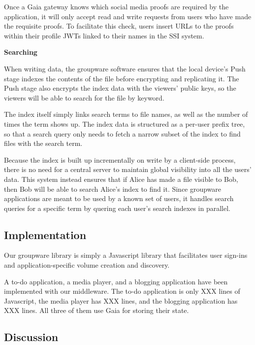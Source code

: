 Once a Gaia gateway knows which social media proofs are required by the
application, it will only accept read and write requests from users who have
made the requisite proofs.  To facilitate this check, users insert URLs to the
proofs within their profile JWTs linked to their names in the SSI system.

\textbf{Searching}

When writing data, the groupware software ensures that the local device's Push
stage indexes the contents of the file before encrypting and replicating it.
The Push stage also encrypts the index data with the viewers' public keys, so
the viewers will be able to search for the file by keyword.

The index itself simply links search terms to file names, as well as the number
of times the term shows up.  The index data is structured as a per-user prefix tree, so
that a search query only needs to fetch a narrow subset of the index to find
files with the search term.

Because the index is built up incrementally on
write by a client-side process, there is no need for a central server to
maintain global visibility into all the users' data.  This system instead
ensures that if Alice has made a file visible to Bob, then Bob will be able to
search Alice's index to find it.  Since groupware applications are meant to be
used by a known set of users, it handles search queries for a specific term by
quering each user's search indexes in parallel.

\subsection{Implementation}

Our groupware library is simply a Javascript library that facilitates user
sign-ins and application-specific volume creation and discovery.


A to-do application, a media player, and a blogging application have been
implemented with our middleware.  The to-do application is only XXX lines of
Javascript, the media player has XXX lines, and the blogging application has XXX
lines.  All three of them use Gaia for storing their state.

\subsection{Discussion}

